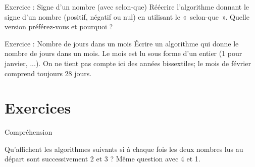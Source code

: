 \begin{Emphase}[exercice]{Exercice : Signe d'un nombre (avec selon-que)}
Réécrire l'algorithme donnant le signe
d'un nombre (positif, négatif ou nul) en utilisant le
«~selon-que~». Quelle version préférez-vous et pourquoi ?
\end{Emphase}


\begin{Emphase}[exercice]{Exercice : Nombre de jours dans un mois}
Écrire un algorithme qui donne le nombre de jours dans un mois. Le mois
est lu sous forme d'un entier (1 pour janvier, ...).
On ne tient pas compte ici des années bissextiles; le mois de février
comprend toujours 28 jours.
\end{Emphase}

\section{Exercices}

\begin{Exercice}{Compréhension}

Qu’affichent les algorithmes suivants si à chaque fois les deux nombres
lus au départ sont successivement 2 et 3 ? Même question avec 4 et 1.



\end{Exercice}

